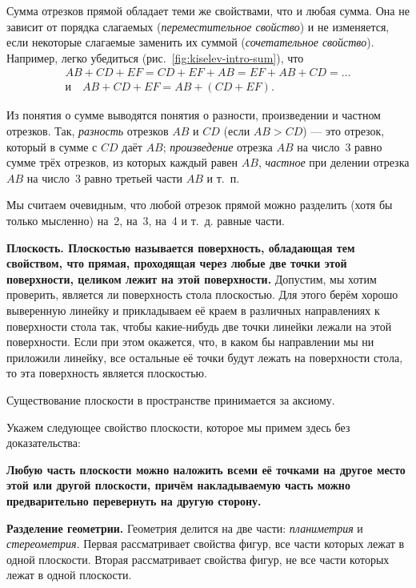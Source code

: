 Сумма отрезков прямой обладает теми же свойствами, что и любая сумма. Она не зависит от порядка слагаемых (\emph{переместительное свойство}) и не изменяется, если некоторые слагаемые заменить их суммой (\emph{сочетательное свойство}). Например, легко убедиться (рис.~\ref{fig:kiselev-intro-sum}), что
\[
    \begin{gathered}
        AB+CD+EF=CD+EF+AB=EF+AB+CD=\dots \\
        \text{и}\quad AB+CD+EF=AB+(CD+EF).
    \end{gathered}
\]

Из понятия о сумме выводятся понятия о разности, произведении и частном отрезков. Так, \emph{разность} отрезков \(AB\) и \(CD\) (если \(AB>CD\)) --- это отрезок, который в сумме с \(CD\) даёт \(AB\); \emph{произведение} отрезка \(AB\) на число~3 равно сумме трёх отрезков, из которых каждый равен \(AB\), \emph{частное} при делении отрезка \(AB\) на число~3 равно третьей части \(AB\) и т.~п.

Мы считаем очевидным, что любой отрезок прямой можно разделить (хотя бы только мысленно) на~2, на~3, на~4 и т.~д. равные части.

 \textbf{Плоскость. Плоскостью называется поверхность, обладающая тем свойством, что прямая, проходящая через любые две точки этой поверхности, целиком лежит на этой поверхности.} Допустим, мы хотим проверить, является ли поверхность стола плоскостью. Для этого берём хорошо выверенную линейку и прикладываем её краем в различных направлениях к поверхности стола так, чтобы какие-нибудь
две точки линейки лежали на этой поверхности. Если при этом окажется, что, в каком бы направлении мы ни приложили линейку, все остальные её точки будут лежать на поверхности стола, то эта поверхность является плоскостью.

Существование плоскости в пространстве принимается за аксиому.

Укажем следующее свойство плоскости, которое мы примем здесь без доказательства:

\textbf{Любую часть плоскости можно наложить всеми её точками на другое место этой или другой плоскости, причём накладываемую часть можно предварительно перевернуть на другую сторону.}

 \textbf{Разделение геометрии.} Геометрия делится на две части: \emph{планиметрия} и \emph{стереометрия}. Первая рассматривает свойства фигур, все части которых лежат в одной плоскости. Вторая рассматривает свойства фигур, не все части которых лежат в одной плоскости.
